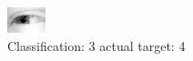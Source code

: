 \begin{figure}[h!]
\begin{center}
\includegraphics[width=0.60\columnwidth]{figures/ID2526_class_3_target_4.png}
\end{center}
\caption{ Classification: 3 actual target: 4}
\label{fig:ID2526_class_3_target_4}
\end{figure}
